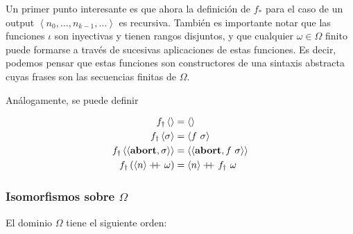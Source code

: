 \documentclass[article, 12pt]{article}
\newcommand\doubleplus{+\kern-1.3ex+\kern0.8ex}
\begin{document}
Un primer punto interesante es que ahora la definición de $f_*$ para el caso de un
output $\left<n_0, \ldots, n_{k-1}, \ldots\right>$ es recursiva. También es
importante notar que las funciones $\iota$ son inyectivas y tienen rangos
disjuntos, y que cualquier $\omega \in \Omega$ finito puede formarse a través de
sucesivas aplicaciones de estas funciones. Es decir, podemos pensar que estas
funciones son constructores de una sintaxis abstracta cuyas frases son las
secuencias finitas de $\Omega$.

Análogamente, se puede definir 

\begin{align*}
  f_\dagger\left< \right> &= \left< \right> \\ 
  f_\dagger \left<\sigma \right> &= \left<f ~ \sigma \right> \\ 
  f_\dagger \left<\left<\textbf{abort}, \sigma \right> \right> &=
  \left<\left<\textbf{abort}, f ~\sigma \right> \right> \\ 
  f_\dagger \left( \left<n \right> \doubleplus \omega \right) &= \left<n \right>
  \doubleplus f_\dagger ~ \omega
\end{align*}
\pagebreak
\subsubsection{Isomorfismos sobre $\Omega$}

El dominio $\Omega$ tiene el siguiente orden:

~
\begin{figure}[!h]
\centering
{}
\end{figure} 
 
\end{document}
